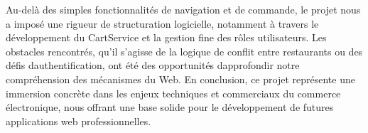 \documentclass[
]{article}
\begin{document}
Au-delà des simples fonctionnalités de navigation et de commande, le
projet nous a imposé une rigueur de structuration logicielle, notamment
à travers le développement du CartService et la gestion fine des rôles
utilisateurs. Les obstacles rencontrés, qu'il s'agisse de la logique de
conflit entre restaurants ou des défis
d\textquotesingle authentification, ont été des opportunités
d\textquotesingle approfondir notre compréhension des mécanismes du Web.
En conclusion, ce projet représente une immersion concrète dans les
enjeux techniques et commerciaux du commerce électronique, nous offrant
une base solide pour le développement de futures applications web
professionnelles.

\section{}\label{section-10}
\end{document}

